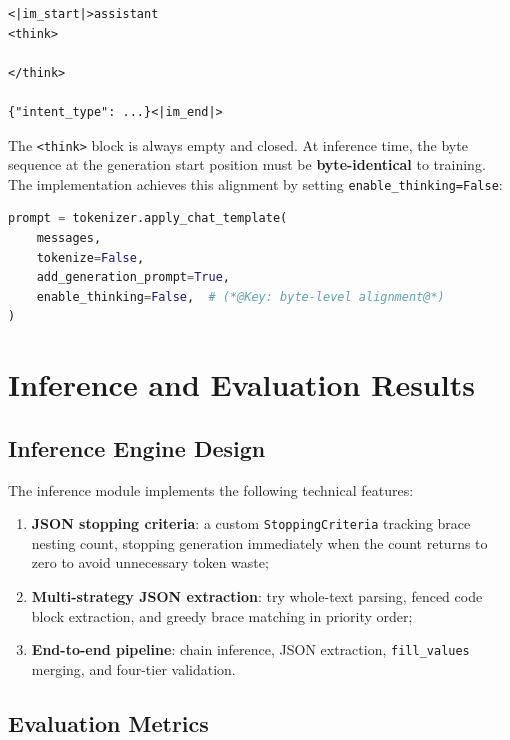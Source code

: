 \documentclass[12pt, a4paper]{article}
\newcommand{\fillvalues}{\texttt{fill\_values}}
\begin{document}
\begin{lstlisting}[language={}, numbers=none]
<|im_start|>assistant
<think>

</think>

{"intent_type": ...}<|im_end|>
\end{lstlisting}

\noindent
The \texttt{<think>} block is always empty and closed. At inference time, the byte sequence at the generation start position must be \textbf{byte-identical} to training. The implementation achieves this alignment by setting \texttt{enable\_thinking=False}:

\begin{lstlisting}[language=Python, caption={Chat template alignment at inference}]
prompt = tokenizer.apply_chat_template(
    messages,
    tokenize=False,
    add_generation_prompt=True,
    enable_thinking=False,  # (*@Key: byte-level alignment@*)
)
\end{lstlisting}

\section{Inference and Evaluation Results}
\label{sec:eval}

\subsection{Inference Engine Design}

The inference module implements the following technical features:

\begin{enumerate}
  \item \textbf{JSON stopping criteria}: a custom \texttt{StoppingCriteria} tracking brace nesting count, stopping generation immediately when the count returns to zero to avoid unnecessary token waste;
  \item \textbf{Multi-strategy JSON extraction}: try whole-text parsing, fenced code block extraction, and greedy brace matching in priority order;
  \item \textbf{End-to-end pipeline}: chain inference, JSON extraction, \fillvalues{} merging, and four-tier validation.
\end{enumerate}

\subsection{Evaluation Metrics}
\end{document}
